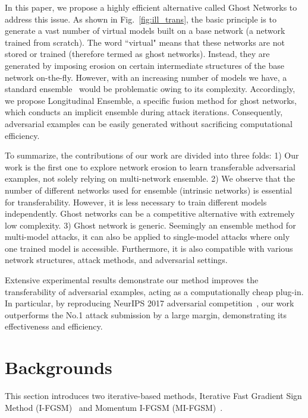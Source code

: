 \documentclass[letterpaper]{article} %
\begin{document}
In this paper, we propose a highly efficient alternative called Ghost Networks to address this issue. As shown in Fig.~\ref{fig:ill_trans}, the basic principle is to generate a vast number of virtual models built on a base network (a network trained from scratch). The word ``virtual" means that these networks are not stored or trained (therefore termed as ghost networks). Instead, they are generated by imposing erosion on certain intermediate structures of the base network on-the-fly. However, with an increasing number of models we have, a standard ensemble~\cite{liu2016delving} would be problematic owing to its complexity. Accordingly, we propose Longitudinal Ensemble, a specific fusion method for ghost networks, which conducts an implicit ensemble during attack iterations. Consequently, adversarial examples can be easily generated without sacrificing computational efficiency.

To summarize, the contributions of our work are divided into three folds: 1) Our work is the first one to explore network erosion to learn transferable adversarial examples, not solely relying on multi-network ensemble. 2) We observe that the number of different networks used for ensemble (intrinsic networks) is essential for transferability. However, it is less necessary to train different models independently. Ghost networks can be a competitive alternative with extremely low complexity. 3) Ghost network is generic. Seemingly an ensemble method for multi-model attacks, it can also be applied to single-model attacks where only one trained model is accessible. Furthermore, it is also compatible with various network structures, attack methods, and adversarial settings.

Extensive experimental results demonstrate our method improves the transferability of adversarial examples, acting as a computationally cheap plug-in. In particular, by reproducing NeurIPS 2017 adversarial competition~\cite{kurakin2018adversarial}, our work outperforms the No.1 attack submission by a large margin, demonstrating its effectiveness and efficiency.

\section{Backgrounds} \label{sec:related work}
This section introduces two iterative-based methods, Iterative Fast Gradient Sign Method (I-FGSM)~\cite{kurakin2016adversarial} and Momentum I-FGSM (MI-FGSM)~\cite{dong2017boosting}.
\end{document}
